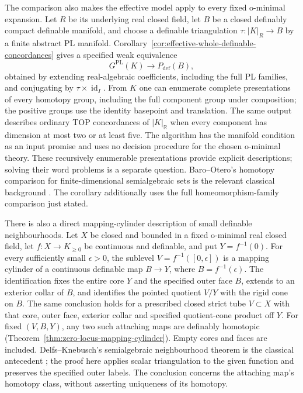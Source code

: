 \documentclass[11pt,a4paper]{article}
\theoremstyle{definition}
\begin{document}
The comparison also makes the effective model apply to every fixed
o-minimal expansion. Let $R$ be its underlying real closed field,
let $B$ be a closed definably compact definable manifold, and choose
a definable triangulation $\tau:|K|_R\to B$ by a finite abstract
PL manifold. Corollary~\ref{cor:effective-whole-definable-concordances}
gives a specified weak equivalence
\[
             G^{\mathrm{PL}}(K)\longrightarrow P_{\mathrm{def}}(B),
\]
obtained by extending real-algebraic coefficients, including the
full PL families, and conjugating by $\tau\times\operatorname{id}_I$.
From $K$ one can enumerate complete presentations of every homotopy
group, including the full component group under composition;
the positive groups use the identity basepoint and translation.
The same output describes ordinary TOP concordances of
$|K|_{\mathbb R}$ when every component has dimension at most two
or at least five. The algorithm has the manifold condition as
an input promise and uses no decision procedure for the chosen
o-minimal theory. These recursively enumerable presentations
provide explicit descriptions; solving their word problems
is a separate question. Baro--Otero's homotopy comparison for
finite-dimensional semialgebraic sets is the relevant classical
background \cite[Theorems~3.1 and 4.1, preprint pp.~5 and 9]
{BaroOtero2008v1}. The corollary additionally uses the full
homeomorphism-family comparison just stated.

There is also a direct mapping-cylinder description of small
definable neighbourhoods. Let $X$ be closed and bounded in a fixed
o-minimal real closed field, let $f:X\to K_{\ge0}$ be continuous
and definable, and put $Y=f^{-1}(0)$. For every sufficiently small
$\epsilon>0$, the sublevel $V=f^{-1}([0,\epsilon])$ is a mapping
cylinder of a continuous definable map $B\to Y$, where
$B=f^{-1}(\epsilon)$. The identification fixes the entire core $Y$
and the specified outer face $B$, extends to an exterior collar of
$B$, and identifies the pointed quotient $V/Y$ with the rigid cone
on $B$. The same conclusion holds for a prescribed closed strict
tube $V\subset X$ with that core, outer face, exterior collar and
specified quotient-cone product off $Y$. For fixed $(V,B,Y)$,
any two such attaching maps are definably homotopic
(Theorem~\ref{thm:zero-locus-mapping-cylinder}). Empty cores and faces
are included. Delfs--Knebusch's semialgebraic neighbourhood theorem
is the classical antecedent
\cite[Theorem~2, p.~48]{DelfsKnebusch1984Retractions}; the proof here
applies scalar triangulation to the given function and preserves
the specified outer labels. The conclusion concerns the attaching
map's homotopy class, without asserting uniqueness of its homotopy.
\end{document}
